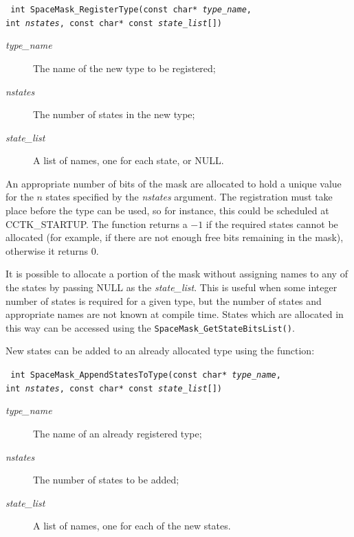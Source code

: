 \documentclass{article}
\begin{document}
\indent\parbox{\linewidth}{
\vspace{\baselineskip}\noindent\texttt{
int SpaceMask\_RegisterType(const char* \emph{type\_name},
  \\\hspace*{10mm}
  int \emph{nstates}, const char* const \emph{state\_list}[])
}\\
\hspace*{10mm}\parbox{\linewidth}{
\begin{description}
  \item[\emph{type\_name}] The name of the new type to be registered;
  \item[\emph{nstates}] The number of states in the new type;
  \item[\emph{state\_list}] A list of names, one for each state, or NULL.
\end{description}
}
}

\noindent An appropriate number of bits of the mask are allocated to
hold a unique value for the $n$ states specified by the \emph{nstates}
argument. The registration must take place before the type can be
used, so for instance, this could be scheduled at CCTK\_STARTUP. The
function returns a $-1$ if the required states cannot be allocated
(for example, if there are not enough free bits remaining in the
mask), otherwise it returns $0$.

It is possible to allocate a portion of the mask without assigning
names to any of the states by passing NULL as the \emph{state\_list}.
This is useful when some integer number of states is required for a
given type, but the number of states and appropriate names are not
known at compile time. States which are allocated in this way can be
accessed using the \texttt{SpaceMask\_GetStateBitsList()}.

New states can be added to an already allocated type using the
function:

\indent\parbox{\linewidth}{
\vspace{\baselineskip}\noindent\texttt{
int SpaceMask\_AppendStatesToType(const char* \emph{type\_name},
  \\\hspace*{10mm}
  int \emph{nstates}, const char* const \emph{state\_list}[])
}\\
\hspace*{10mm}\parbox{\linewidth}{
\begin{description}
  \item[\emph{type\_name}] The name of an already registered type;
  \item[\emph{nstates}] The number of states to be added;
  \item[\emph{state\_list}] A list of names, one for each of the new
    states.
\end{description}
}}
\end{document}
